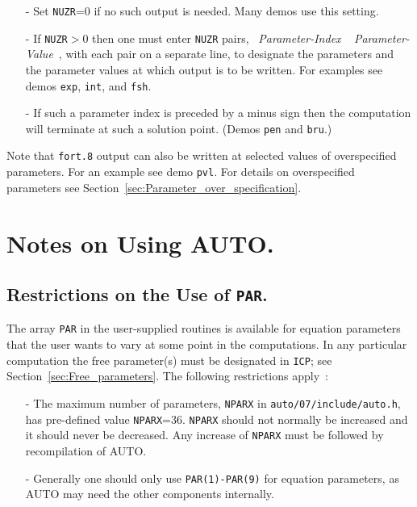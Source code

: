 \documentclass[12pt]{report}
\begin{document}
\begin{itemize}
\item[-]
 Set {\tt NUZR}=0 if no such output is needed. Many demos use this setting.
\item[-]
 If {\tt NUZR}$>$0 then one must enter {\tt NUZR} pairs,
            ~{\it Parameter-Index} ~ {\it Parameter-Value}~,
 with each pair on a separate line, to designate the parameters and the parameter
 values at which output is to be written.
 For examples see demos {\tt exp}, {\tt int}, and {\tt fsh}.
\item[-]
 If such a parameter index is preceded by a minus sign then the computation will
 terminate at such a solution point.
 (Demos {\tt pen} and {\tt bru}.)
\end{itemize}

Note that {\tt fort.8} output can also be written at selected values of 
overspecified parameters. For an example see demo {\tt pvl}.
For details on overspecified parameters see 
Section~\ref{sec:Parameter_over_specification}.
 

\chapter{ Notes on Using {\cal AUTO}.}  \label{ch:Notes_on_Using_AUTO}
\section{ Restrictions on the Use of {\tt PAR}.} \label{sec:Restrictions_on_PAR}
The array {\tt PAR} in the user-supplied routines is available
for equation parameters that the user wants to vary at some point
in the computations.
In any particular computation the free parameter(s) must be designated
in {\tt ICP}; see Section~\ref{sec:Free_parameters}.
The following restrictions apply~:

\begin{itemize}
\item[-]
  The maximum number of parameters, {\tt NPARX} in {\tt auto/07/include/auto.h},
  has pre-defined value {\tt NPARX}=36.  {\tt NPARX} should not normally be increased
  and it should never be decreased.
  Any increase of {\tt NPARX} must be followed by recompilation of {\cal AUTO}.
\item[-]
  Generally one should only use {\tt PAR(1)-PAR(9)} for equation parameters,
  as {\cal AUTO} may need the other components internally.  
\end{itemize}
\end{document}
